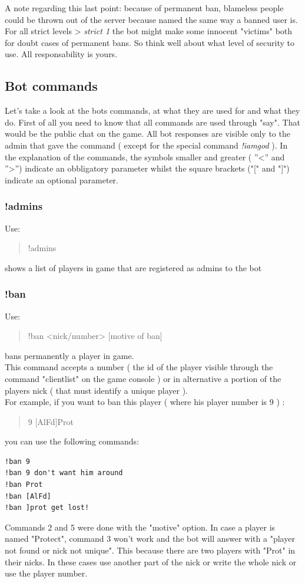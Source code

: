 \documentclass[a4paper]{article}
\begin{document}
A note regarding this last point: because of permanent ban, blameless people could be thrown out of the server because named the same
way a banned user is.
For all strict levels \textgreater{} \textit{strict 1} the bot might make some innocent "victims" both for doubt cases of permanent bans.
So think well about what level of security to use. All responsability is yours.

\newpage
\subsection{Bot commands}
Let's take a look at the bots commands, at what they are used for and what they do.
First of all you need to know that all commands are used through "say". That would be the public chat on the game.
All bot responses are visible only to the admin that gave the command ( except for the special command \textit{!iamgod} ).
In the explanation of the commands, the symbols smaller and greater ( ''\textless{}'' and ''\textgreater{}'') indicate an obbligatory parameter
whilst the square brackets ("[" and "]") indicate an optional parameter.

\subsubsection{!admins}
Use:
\begin{quote}
!admins
\end{quote}
shows a list of players in game that are registered as admins to the bot

\subsubsection{!ban}
Use:
\begin{quote}
!ban \textless{}nick/number\textgreater{} [motive of ban]
\end{quote}
bans permanently a player in game.\\
This command accepts a number ( the id of the player visible through the command "clientlist" on the game console ) or in alternative
a portion of the players nick ( that must identify a unique player ).\\
For example, if you want to ban this player ( where his player number is 9 ) :
\begin{quote}
9 [AlFd]Prot
\end{quote}
you can use the following commands:
\begin{lstlisting}
!ban 9
!ban 9 don't want him around
!ban Prot
!ban [AlFd]
!ban ]prot get lost!
\end{lstlisting}
Commands 2 and 5 were done with the "motive" option.
In case a player is named "Protect", command 3 won't work and the bot will answer with a "player not found or nick not unique".
This because there are two players with "Prot" in their nicks.
In these cases use another part of the nick or write the whole nick or use the player number.
\end{document}
